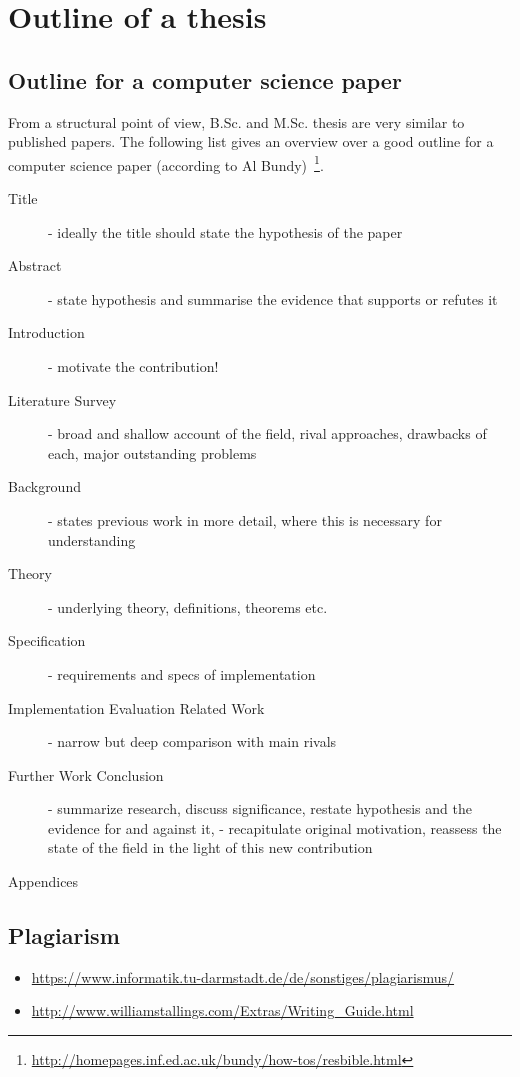 \documentclass{article}
\begin{document}
\section{Outline of a thesis}




\subsection{Outline for a computer science paper}

From a structural point of view, B.Sc. and M.Sc. thesis are very similar to published papers.
The following list gives an overview over a good outline for a computer science paper (according to Al Bundy)~\footnote{\url{http://homepages.inf.ed.ac.uk/bundy/how-tos/resbible.html}}.

\begin{description}
	\item[Title] - ideally the title should state the hypothesis of the paper
	\item[Abstract] - state hypothesis and summarise the evidence that supports or refutes it
	\item[Introduction] - motivate the contribution!
	\item[Literature Survey] - broad and shallow account of the field, rival approaches, drawbacks of each, major outstanding problems
	\item[Background] - states previous work in more detail, where this is necessary for understanding
	\item[Theory] - underlying theory, definitions, theorems etc.
	\item[Specification] - requirements and specs of implementation
	\item[Implementation Evaluation Related Work] - narrow but deep comparison with main rivals
	\item[Further Work Conclusion] - summarize research, discuss significance, restate hypothesis and the evidence for and against it, - recapitulate original motivation, reassess the state of the field in the light of this new contribution
	\item[Appendices]
\end{description}




\subsection{Plagiarism}

\begin{itemize}
	\item \url{https://www.informatik.tu-darmstadt.de/de/sonstiges/plagiarismus/}
	\item \url{http://www.williamstallings.com/Extras/Writing_Guide.html}
\end{itemize}
\end{document}
